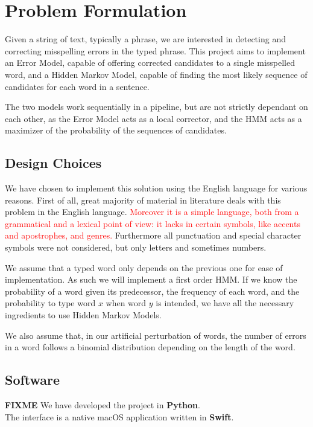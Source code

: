 \chapter{Problem Formulation}

Given a string of text, typically a phrase, we are interested in detecting and correcting misspelling errors in the 
typed phrase. This project aims to implement an Error Model, capable of offering corrected candidates to a single 
misspelled word, and a Hidden Markov Model, capable of finding the most likely sequence of candidates for each word in 
a sentence.

The two models work sequentially in a pipeline, but are not strictly dependant 
on each other, as the Error Model acts as a local corrector, and the HMM acts 
as a maximizer of the probability of the sequences of candidates.

\section{Design Choices}

We have chosen to implement this solution using the English language for various reasons. First of all, great majority of material in literature 
deals with this problem in the English language. \textcolor{red}{Moreover it is a simple language, both from a 
	grammatical and a lexical point of view: it lacks in certain symbols, like accents and apostrophes, and genres. }
Furthermore all punctuation and special character symbols were not considered, but only letters and sometimes 
numbers. 

We assume that a typed word only depends on the previous one for ease of implementation. As such we will implement a first order HMM. 
If we know the probability of a word given its predecessor, the frequency of each word, and the probability to 
type word $x$ when word $y$ is intended, we have all the necessary ingredients to use Hidden Markov Models.

We also assume that, in our artificial perturbation of words, the number of errors in a word follows a binomial 
distribution depending on the length of the word.

\section{Software}
\textbf{FIXME}
We have developed the project in \textbf{Python}.\\
The interface is a native macOS application written in \textbf{Swift}.